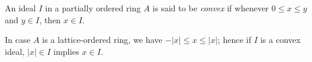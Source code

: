 An ideal $I$ in a partially ordered ring $A$ is said to be \emph{convex} if whenever $0 \leq x \leq y$ and $y \in I$, then $x \in I$.

In case $A$ is a lattice-ordered ring, we have $-|x| \leq x \leq |x|$; hence if $I$ is a convex ideal, $|x| \in I$ implies $x \in I$.
